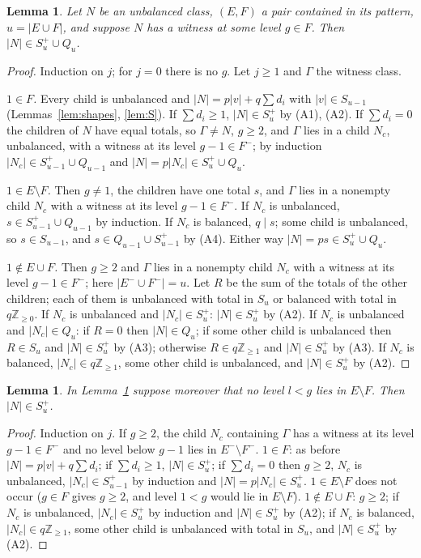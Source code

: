 \documentclass[11pt,a4paper]{amsart}
\newtheorem{lemma}[theorem]{Lemma}
\theoremstyle{definition}
\theoremstyle{remark}
\newcommand{\Z}{\mathbb{Z}}
\newcommand{\Sp}{S^{+}}
\begin{document}
\begin{lemma}\label{lem:Sp}
Let $N$ be an unbalanced class, $(E,F)$ a pair contained in its pattern, $u=|E\cup F|$, and suppose $N$ has
a witness at some level $g\in F$. Then $|N|\in\Sp_u\cup Q_u$.
\end{lemma}
\begin{proof}
Induction on $j$; for $j=0$ there is no $g$. Let $j\ge1$ and $\Gamma$ the witness class.

\emph{$1\in F$.} Every child is unbalanced and $|N|=p|v|+q\sum d_i$ with $|v|\in S_{u-1}$
(Lemmas~\ref{lem:shapes}, \ref{lem:S}). If $\sum d_i\ge1$, $|N|\in\Sp_u$ by (A1), (A2). If $\sum d_i=0$ the
children of $N$ have equal totals, so $\Gamma\ne N$, $g\ge2$, and $\Gamma$ lies in a child $N_c$, unbalanced,
with a witness at its level $g-1\in F^-$; by induction $|N_c|\in\Sp_{u-1}\cup Q_{u-1}$ and
$|N|=p|N_c|\in\Sp_u\cup Q_u$.

\emph{$1\in E\setminus F$.} Then $g\ne1$, the children have one total $s$, and $\Gamma$ lies in a nonempty
child $N_c$ with a witness at its level $g-1\in F^-$. If $N_c$ is unbalanced, $s\in\Sp_{u-1}\cup Q_{u-1}$ by
induction. If $N_c$ is balanced, $q\mid s$; some child is unbalanced, so $s\in S_{u-1}$, and
$s\in Q_{u-1}\cup\Sp_{u-1}$ by (A4). Either way $|N|=ps\in\Sp_u\cup Q_u$.

\emph{$1\notin E\cup F$.} Then $g\ge2$ and $\Gamma$ lies in a nonempty child $N_c$ with a witness at its
level $g-1\in F^-$; here $|E^-\cup F^-|=u$. Let $R$ be the sum of the totals of the other children; each of
them is unbalanced with total in $S_u$ or balanced with total in $q\Z_{\ge0}$. If $N_c$ is unbalanced and
$|N_c|\in\Sp_u$: $|N|\in\Sp_u$ by (A2). If $N_c$ is unbalanced and $|N_c|\in Q_u$: if $R=0$ then
$|N|\in Q_u$; if some other child is unbalanced then $R\in S_u$ and $|N|\in\Sp_u$ by (A3); otherwise
$R\in q\Z_{\ge1}$ and $|N|\in\Sp_u$ by (A3). If $N_c$ is balanced, $|N_c|\in q\Z_{\ge1}$, some other child is
unbalanced, and $|N|\in\Sp_u$ by (A2).
\end{proof}

\begin{lemma}\label{lem:Spp}
In Lemma~\ref{lem:Sp} suppose moreover that no level $l<g$ lies in $E\setminus F$. Then $|N|\in\Sp_u$.
\end{lemma}
\begin{proof}
Induction on $j$. If $g\ge2$, the child $N_c$ containing $\Gamma$ has a witness at its level $g-1\in F^-$
and no level below $g-1$ lies in $E^-\setminus F^-$. \emph{$1\in F$}: as before
$|N|=p|v|+q\sum d_i$; if $\sum d_i\ge1$, $|N|\in\Sp_u$; if $\sum d_i=0$ then $g\ge2$, $N_c$ is unbalanced,
$|N_c|\in\Sp_{u-1}$ by induction and $|N|=p|N_c|\in\Sp_u$. \emph{$1\in E\setminus F$} does not occur
($g\in F$ gives $g\ge2$, and level $1<g$ would lie in $E\setminus F$). \emph{$1\notin E\cup F$}: $g\ge 2$; if
$N_c$ is unbalanced, $|N_c|\in\Sp_u$ by induction and $|N|\in\Sp_u$ by (A2); if $N_c$ is balanced,
$|N_c|\in q\Z_{\ge1}$, some other child is unbalanced with total in $S_u$, and $|N|\in\Sp_u$ by (A2).
\end{proof}
\end{document}
